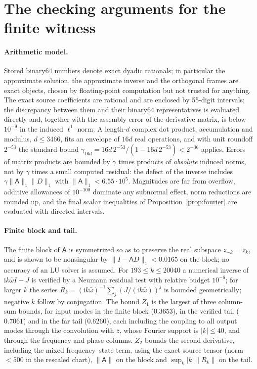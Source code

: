 \documentclass[11pt,a4paper]{article}
\theoremstyle{plain}
\theoremstyle{definition}
\theoremstyle{remark}
\newcommand{\ii}{\mathrm i}
\newcommand{\norm}[1]{\lVert#1\rVert}
\newcommand{\abs}[1]{\lvert#1\rvert}
\begin{document}
\section{The checking arguments for the finite witness}\label{app:finite}
\paragraph{Arithmetic model.} Stored binary64 numbers denote exact dyadic rationals; in particular the approximate solution, the approximate inverse and the orthogonal frames are exact objects, chosen by floating-point computation but not trusted for anything. The exact source coefficients are rational and are enclosed by 55-digit intervals; the discrepancy between them and their binary64 representatives is evaluated directly and, together with the assembly error of the derivative matrix, is below $10^{-9}$ in the induced $\ell^1$ norm. A length-$d$ complex dot product, accumulation and modulus, $d\le3466$, fits an envelope of $16d$ real operations, and with unit roundoff $2^{-53}$ the standard bound $\gamma_{16d}=16d\,2^{-53}/(1-16d\,2^{-53})<2^{-36}$ \cite{Higham02} applies. Errors of matrix products are bounded by $\gamma$ times products of \emph{absolute} induced norms, not by $\gamma$ times a small computed residual: the defect of the inverse includes $\gamma\norm{\mathsf A}_1\norm{D}_1$ with $\norm{\mathsf A}_1<6.55\cdot10^{5}$. Magnitudes are far from overflow, additive allowances of $10^{-100}$ dominate any subnormal effect, norm reductions are rounded up, and the final scalar inequalities of Proposition~\ref{prop:fourier} are evaluated with directed intervals.

\paragraph{Finite block and tail.} The finite block of $\mathsf A$ is symmetrized so as to preserve the real subspace $z_{-k}=\bar z_k$, and is shown to be nonsingular by $\norm{I-\mathsf AD}_1<0.0165$ on the block; no accuracy of an LU solver is assumed. For $193\le k\le20040$ a numerical inverse of $\ii k\bar\omega I-J$ is verified by a Neumann residual test with relative budget $10^{-6}$; for larger $k$ the series $R_k=(\ii k\bar\omega)^{-1}\sum_j(J/(\ii k\bar\omega))^j$ is bounded geometrically; negative $k$ follow by conjugation. The bound $Z_1$ is the largest of three column-sum bounds, for input modes in the finite block ($0.3653$), in the verified tail ($0.7061$) and in the far tail ($0.6260$), each including the coupling to all output modes through the convolution with $\bar z$, whose Fourier support is $\abs k\le40$, and through the frequency and phase columns. $Z_2$ bounds the second derivative, including the mixed frequency--state term, using the exact source tensor (norm $<500$ in the rescaled chart), $\norm{\mathsf A}$ on the block and $\sup_k\abs k\norm{R_k}$ on the tail.
\end{document}

